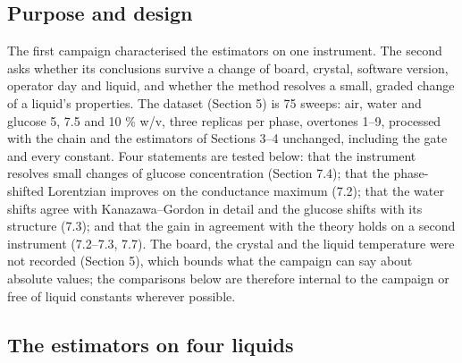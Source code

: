 \documentclass[11pt,a4paper]{article}
\begin{document}
\hypertarget{purpose-and-design}{%
\subsection{Purpose and design}\label{purpose-and-design}}

The first campaign characterised the estimators on one instrument. The
second asks whether its conclusions survive a change of board, crystal,
software version, operator day and liquid, and whether the method
resolves a small, graded change of a liquid's properties. The dataset
(Section 5) is 75 sweeps: air, water and glucose 5, 7.5 and 10 \% w/v,
three replicas per phase, overtones 1--9, processed with the chain and
the estimators of Sections 3--4 unchanged, including the gate and every
constant. Four statements are tested below: that the instrument resolves
small changes of glucose concentration (Section 7.4); that the
phase-shifted Lorentzian improves on the conductance maximum (7.2); that
the water shifts agree with Kanazawa--Gordon in detail and the glucose
shifts with its structure (7.3); and that the gain in agreement with the
theory holds on a second instrument (7.2--7.3, 7.7). The board, the
crystal and the liquid temperature were not recorded (Section 5), which
bounds what the campaign can say about absolute values; the comparisons
below are therefore internal to the campaign or free of liquid constants
wherever possible.

\hypertarget{the-estimators-on-four-liquids}{%
\subsection{The estimators on four
liquids}\label{the-estimators-on-four-liquids}}
\end{document}
